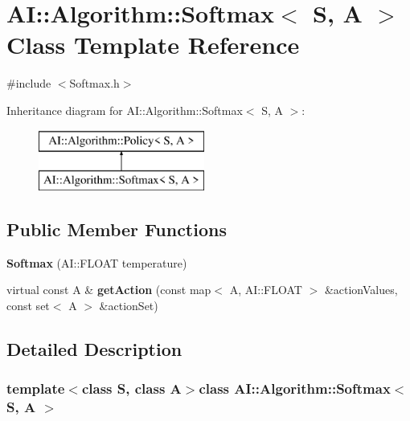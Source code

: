 \hypertarget{classAI_1_1Algorithm_1_1Softmax}{\section{A\-I\-:\-:Algorithm\-:\-:Softmax$<$ S, A $>$ Class Template Reference}
\label{classAI_1_1Algorithm_1_1Softmax}
}


{\ttfamily \#include $<$Softmax.\-h$>$}

Inheritance diagram for A\-I\-:\-:Algorithm\-:\-:Softmax$<$ S, A $>$\-:\begin{figure}[H]
\begin{center}
\leavevmode
\includegraphics[height=2.000000cm]{classAI_1_1Algorithm_1_1Softmax}
\end{center}
\end{figure}
\subsection*{Public Member Functions}
\begin{DoxyCompactItemize}
\item 
\hypertarget{classAI_1_1Algorithm_1_1Softmax_a4e3649de002376f4e30c9c773d0623fe}{{\bfseries Softmax} (A\-I\-::\-F\-L\-O\-A\-T temperature)}\label{classAI_1_1Algorithm_1_1Softmax_a4e3649de002376f4e30c9c773d0623fe}

\item 
\hypertarget{classAI_1_1Algorithm_1_1Softmax_ab16e92936d539552a7592f0be453ddef}{virtual const A \& {\bfseries get\-Action} (const map$<$ A, A\-I\-::\-F\-L\-O\-A\-T $>$ \&action\-Values, const set$<$ A $>$ \&action\-Set)}\label{classAI_1_1Algorithm_1_1Softmax_ab16e92936d539552a7592f0be453ddef}

\end{DoxyCompactItemize}


\subsection{Detailed Description}
\subsubsection*{template$<$class S, class A$>$class A\-I\-::\-Algorithm\-::\-Softmax$<$ S, A $>$}

